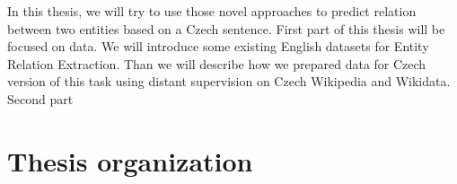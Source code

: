 In this thesis, we will try to use those novel approaches to predict relation between two entities based on a Czech sentence. First part of this thesis will be focused on data. We will  introduce some existing English datasets for Entity Relation Extraction. Than we will describe how we prepared data for Czech version of this task using distant supervision on Czech Wikipedia and Wikidata. Second part 

\section{Thesis organization}
